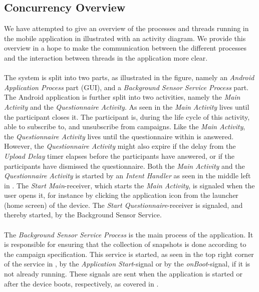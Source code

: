 \subsection{Concurrency Overview}
We have attempted to give an overview of the processes and threads running in the mobile application in  illustrated with an activity diagram. We provide this overview in a hope to make the communication between the different processes and the interaction between threads in the application more clear.
\\\\
The system is split into two parts, as illustrated in the figure, namely an \emph{Android Application Process} part (GUI), and a \emph{Background Sensor Service Process} part. The Android application is further split into two activities, namely the \emph{Main Activity} and the \emph{Questionnaire Activity}. As seen in  the \emph{Main Activity} lives until the participant closes it. The participant is, during the life cycle of this activity, able to subscribe to, and unsubscribe from campaigns. Like the \emph{Main Activity}, the \emph{Questionnaire Activity} lives until the questionnaire within is answered. However, the \emph{Questionnaire Activity} might also expire if the delay from the \emph{Upload Delay} timer elapses before the participants have answered, or if the participants have dismissed the questionnaire. Both the \emph{Main Activity} and the \emph{Questionnaire Activity} is started by an \emph{Intent Handler} as seen in the middle left in . The \emph{Start Main}-receiver, which starts the \emph{Main Activity}, is signaled when the user opens it, for instance by clicking the application icon from the launcher (home screen) of the device. The \emph{Start Questionnaire}-receiver is signaled, and thereby started, by the Background Sensor Service.
\\\\
The \emph{Background Sensor Service Process} is the main process of the application. It is responsible for ensuring that the collection of snapshots is done according to the campaign specification. This service is started, as seen in the top right corner of the service in , by the \emph{Application Start}-signal or by the \emph{onBoot}-signal, if it is not already running. These signals are sent when the application is started or after the device boots, respectively, as covered in . 
